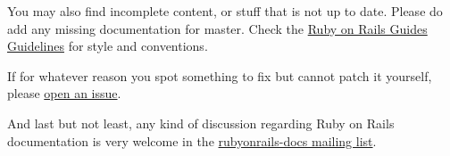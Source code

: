 \documentclass[10pt]{book}
\begin{document}
           You may also find incomplete content, or stuff that is not up to date.           Please do add any missing documentation for master. Check the           \href{http://guides.rubyonrails.org/ruby_on_rails_guides_guidelines.html}{Ruby on Rails Guides Guidelines}           for style and conventions.         

           If for whatever reason you spot something to fix but cannot patch it yourself, please           \href{https://github.com/rails/rails/issues}{open an issue}.         

And last but not least, any kind of discussion regarding Ruby on Rails           documentation is very welcome in the \href{http://groups.google.com/group/rubyonrails-docs}{rubyonrails-docs mailing list}.
\end{document}
